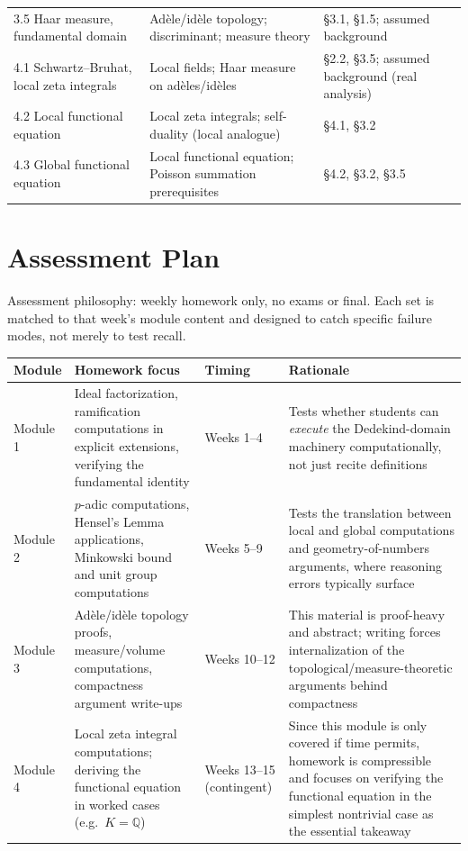 \documentclass[11pt]{article}
\newcommand{\Q}{\mathbb{Q}}
\begin{document}
\begin{longtable}{p{3.6cm} p{6.2cm} p{4.4cm}}
3.5 Haar measure, fundamental domain & Adèle/idèle topology; discriminant; measure theory & \S3.1, \S1.5; assumed background \\
4.1 Schwartz--Bruhat, local zeta integrals & Local fields; Haar measure on adèles/idèles & \S2.2, \S3.5; assumed background (real analysis) \\
4.2 Local functional equation & Local zeta integrals; self-duality (local analogue) & \S4.1, \S3.2 \\
4.3 Global functional equation & Local functional equation; Poisson summation prerequisites & \S4.2, \S3.2, \S3.5 \\
\bottomrule
\end{longtable}

\section{Assessment Plan}
Assessment philosophy: weekly homework only, no exams or final. Each set is matched to that week's module content and designed to catch specific failure modes, not merely to test recall.

\begin{longtable}{p{2.4cm} p{5.2cm} p{2.0cm} p{5.0cm}}
\toprule
\textbf{Module} & \textbf{Homework focus} & \textbf{Timing} & \textbf{Rationale} \\
\midrule
\endhead
Module 1 & Ideal factorization, ramification computations in explicit extensions, verifying the fundamental identity & Weeks 1--4 & Tests whether students can \emph{execute} the Dedekind-domain machinery computationally, not just recite definitions \\
Module 2 & $p$-adic computations, Hensel's Lemma applications, Minkowski bound and unit group computations & Weeks 5--9 & Tests the translation between local and global computations and geometry-of-numbers arguments, where reasoning errors typically surface \\
Module 3 & Adèle/idèle topology proofs, measure/volume computations, compactness argument write-ups & Weeks 10--12 & This material is proof-heavy and abstract; writing forces internalization of the topological/measure-theoretic arguments behind compactness \\
Module 4 & Local zeta integral computations; deriving the functional equation in worked cases (e.g.\ $K=\Q$) & Weeks 13--15 (contingent) & Since this module is only covered if time permits, homework is compressible and focuses on verifying the functional equation in the simplest nontrivial case as the essential takeaway \\
\bottomrule
\end{longtable}
\end{document}
